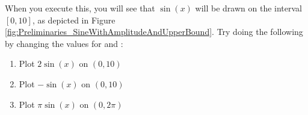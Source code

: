

When you execute this, you will see that $\sin(x)$ will be drawn on the interval $[0,10]$, as depicted in Figure \ref{fig:Preliminaries_SineWithAmplitudeAndUpperBound}. Try doing the following by changing the values for  and :


\begin{enumerate}
	   \item Plot $2\sin(x)$ on $(0,10)$
	   \item Plot $-\sin(x)$ on $(0,10)$
	   \item Plot $\pi\sin(x)$ on $(0, 2 \pi)$
\end{enumerate}
